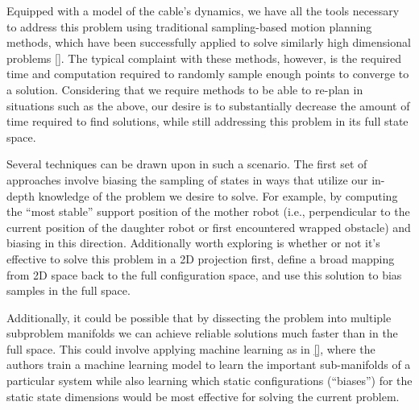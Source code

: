 \documentclass[12pt]{article}
\begin{document}
Equipped with a model of the cable's dynamics, we have all the tools necessary to address this problem 
using traditional sampling-based motion planning methods, which have been successfully applied to solve similarly 
high dimensional problems \ref{}. The typical complaint with these methods, however, is the required time and 
computation required to randomly sample enough points to converge to a solution. Considering that we require 
methods to be able to re-plan in situations such as the above, our desire is to substantially decrease the amount of time 
required to find solutions, while still addressing this problem in its full state space. 

Several techniques can be drawn upon in such a scenario. The first set of approaches involve biasing the sampling of states 
in ways that utilize our in-depth knowledge of the problem we desire to solve. For example, by computing the ``most stable'' support 
position of the mother robot (i.e., perpendicular to the current position of the daughter robot or first encountered wrapped obstacle) 
and biasing in this direction. Additionally worth exploring is whether or not it's effective to solve this problem in 
a 2D projection first, define a broad mapping from 2D space back to the full configuration space, and use this solution to bias samples
in the full space. 

Additionally, it could be possible that by dissecting the problem into multiple subproblem manifolds we can achieve reliable 
solutions much faster than in the full space. This could involve applying machine learning as in \ref{}, where the authors 
train a machine learning model to learn the important sub-manifolds of a particular system while also learning which static 
configurations (``biases'') for the static state dimensions would be most effective for solving the current problem. 











\small{}

\end{document}
